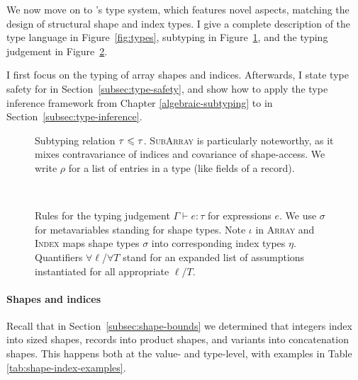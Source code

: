 We now move on to \starr{}'s type system, which features novel aspects, matching the design of structural shape and index types. 
I give a complete description of the type language in Figure~\ref{fig:types}, subtyping in Figure~\ref{fig:subtyping}, and the typing judgement in Figure~\ref{fig:typing}. 

I first focus on the typing of array shapes and indices.
Afterwards, I state type safety for \starr{} in Section~\ref{subsec:type-safety}, and show how to apply the type inference framework from Chapter \ref{algebraic-subtyping} to \starr{} in Section~\ref{subsec:type-inference}.


\begin{figure}[p]
    \centering
    
    \caption{
        Subtyping relation $\tau \leqslant \tau$. \textsc{SubArray} is particularly noteworthy, as it mixes contravariance of indices and covariance of shape-access. 
        We write $\rho$ for a list of entries in a type (like fields of a record). 
    }
    \label{fig:subtyping}
\end{figure}
~
\begin{figure}[p]
    \centering
    
    \caption{Rules for the typing judgement $\Gamma \vdash e : \tau$ for \starr{} expressions $e$. We use $\sigma$ for metavariables standing for shape types.
    Note $\iota$ in \textsc{Array} and \textsc{Index} maps shape types $\sigma$ into corresponding index types $\eta$. 
    Quantifiers $\forall \ell$/$\forall T$ stand for an expanded list of assumptions instantiated for all appropriate $\ell$/$T$.
    }
    \label{fig:typing}
\end{figure}

\paragraph{Shapes and indices}

Recall that in Section~\ref{subsec:shape-bounds} we determined that integers index into sized shapes, records into product shapes, and variants into concatenation shapes. This happens both at the value- and type-level, with examples in Table \ref{tab:shape-index-examples}.

